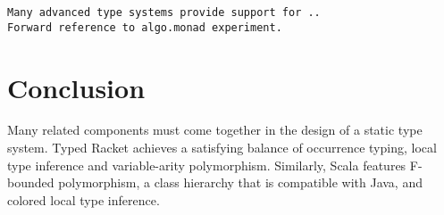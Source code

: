 \begin{verbatim}
Many advanced type systems provide support for ..
Forward reference to algo.monad experiment.
\end{verbatim}

\section{Conclusion}

Many related components must come together in the design of a
static type system. Typed Racket achieves a satisfying balance of 
occurrence typing, local type inference and variable-arity polymorphism.
Similarly, Scala features F-bounded polymorphism, a class hierarchy
that is compatible with Java, and colored local type inference.
